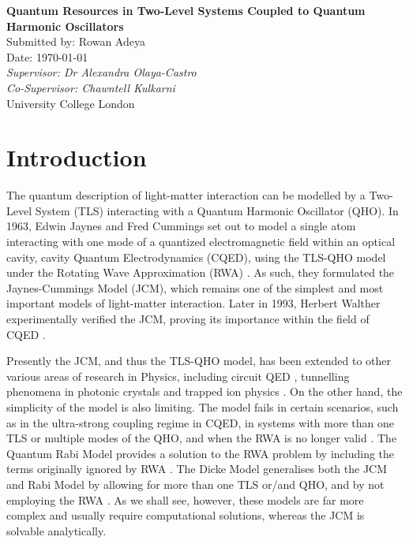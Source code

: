 \documentclass[12pt,a4paper]{article}
\begin{document}
\begin{titlepage}
    \centering
    \vspace*{2cm}
    \Huge\textbf{Quantum Resources in Two-Level Systems Coupled to Quantum Harmonic Oscillators} \\
    \vspace{1cm}
    \small{Submitted by: Rowan Adeya \\
    Date: \today} \\
    \vspace{1cm}
    \small{\textit{Supervisor: Dr Alexandra Olaya-Castro}} \\
    \small{\textit{Co-Supervisor: Chawntell Kulkarni}} \\
    

    \vfill
    \normalsize
    University College London
\end{titlepage}

\tableofcontents

\newpage

\section{Introduction} \label{intro}

The quantum description of light-matter interaction can be modelled by a Two-Level System (TLS) interacting with a Quantum Harmonic Oscillator (QHO). In 1963, Edwin Jaynes and Fred Cummings set out to model a single atom interacting with one mode of a quantized electromagnetic field within an optical cavity, cavity Quantum Electrodynamics (CQED), using the TLS-QHO model under the Rotating Wave Approximation (RWA) \cite{Context1963-JC_Original}. As such, they formulated the Jaynes-Cummings Model (JCM), which remains one of the simplest and most important models of light-matter interaction. Later in 1993, Herbert Walther experimentally verified the JCM, proving its importance within the field of CQED \cite{Context1993-JC_Verification}. 

Presently the JCM, and thus the TLS-QHO model, has been extended to other various areas of research in Physics, including circuit QED \cite{Context2018-Supercond_qubit}, tunnelling phenomena in photonic crystals \cite{Context2012-Tunneling_photons} and trapped ion physics \cite{Context1992-Trapped_ions}. On the other hand, the simplicity of the model is also limiting. The model fails in certain scenarios, such as in the ultra-strong coupling regime in CQED, in systems with more than one TLS or multiple modes of the QHO, and when the RWA is no longer valid \cite{General2024-JC_overview}. The Quantum Rabi Model provides a solution to the RWA problem by including the terms originally ignored by RWA \cite{}. The Dicke Model generalises both the JCM and Rabi Model by allowing for more than one TLS or/and QHO, and by not employing the RWA \cite{}. As we shall see, however, these models are far more complex and usually require computational solutions, whereas the JCM is solvable analytically. 
\end{document}
